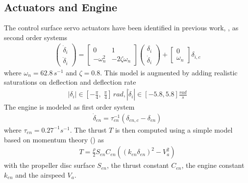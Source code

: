 \documentclass{ifacconf}
\begin{document}
\subsection{Actuators and Engine}
The control surface servo actuators have been identified in previous work, \cite{ameho2013pilotage}, as second order systems 
\begin{align}
\begin{pmatrix}
\dot{\delta}_i \\
\ddot{\delta}_i
\end{pmatrix}
=
\begin{bmatrix}
0 & 1 \\
-\omega_n^2 & -2 \zeta \omega_n 
\end{bmatrix}
\begin{pmatrix}
\delta_i \\
\dot{\delta}_i
\end{pmatrix}
+
\begin{bmatrix}
0\\
\omega_n
\end{bmatrix}
\delta_{i, c}
\end{align}
where $\omega_n=62.8 \, s^{-1}$ and $\zeta=0.8$.
This model is augmented by adding realistic saturations on deflection and deflection rate
%
\begin{align}
|\delta_i| \in [-\frac{\pi}{4}, \; \frac{\pi}{4}]\, rad, |\dot{\delta}_i| \in [-5.8, 5.8] \frac{rad}{s}
\end{align}
The engine is modeled as first order system
%
\begin{align}
\dot{\delta}_{en}
=
\tau_{en}^{-1}
(
\delta_{en, c}
- \delta_{en}
)
\end{align}
%
where $\tau_{en} = 0.27^{-1}s^{-1}$. The thrust $T$ is then computed using a simple model based on momentum theory (\cite{Beard2012}) as
%
\begin{align}
T = \frac{\rho}{2}
S_{en}
C_{en} 
(
(k_{en}\delta_{en})^2
-V_a^2
)
\end{align}
with the propeller disc surface $S_{en}$, the thrust constant $C_{en}$, the engine constant $k_{en}$ and the airspeed $V_a$.
%
%
\end{document}
